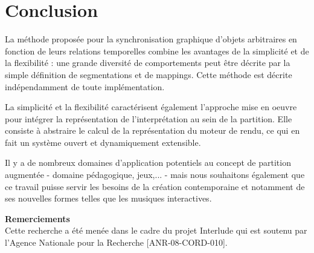\documentclass{article}
\begin{document}
\section{Conclusion}

La méthode proposée pour la synchronisation graphique d'objets arbitraires en fonction de leurs relations temporelles combine les avantages de la simplicité et de la flexibilité : une grande diversité de comportements peut être décrite par la simple définition de segmentations et de mappings. Cette méthode est décrite indépendamment de toute implémentation.

La simplicité et la flexibilité caractérisent également l'approche mise en oeuvre pour intégrer la représentation de l'interprétation au sein de la partition. Elle consiste à abstraire le calcul de la représentation du moteur de rendu, ce qui en fait un système ouvert et dynamiquement extensible.

Il y a de nombreux domaines d'application potentiels au concept de partition augmentée - domaine pédagogique, jeux,... - mais nous souhaitons également que ce travail puisse servir les besoins de la création contemporaine et notamment de ses nouvelles formes telles que les musiques interactives.


\vspace{4mm}
\hspace{-5mm}
\textbf{Remerciements} \\
Cette recherche a été menée dans le cadre du projet Interlude qui est soutenu par l'Agence Nationale pour la Recherche [ANR-08-CORD-010].

%


\end{document}
